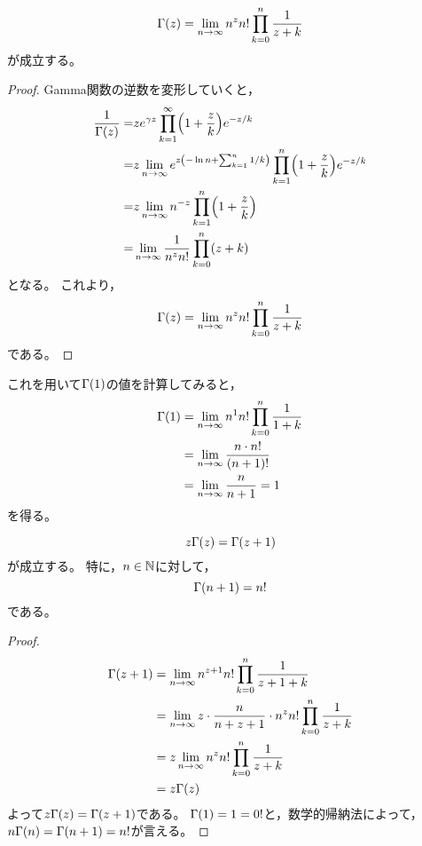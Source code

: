 \documentclass[a4paper,draft]{ltjsarticle}
\begin{document}
\begin{prop}[Gamma関数のEuler乗積表示]\label{prop:gamma-euler}
    \begin{equation}
        \fun{\Gamma}{z}=\limn n^z n! \prod_{k=0}^n\dfrac{1}{z+k}
    \end{equation}
    が成立する。
    \begin{proof}
        Gamma関数の逆数を変形していくと，
        \begin{align}
            \dfrac{1}{\fun{\Gamma}{z}}
            = & ze^{\gamma z}\prod_{k=1}^\infty\pare{1+\dfrac{z}{k}}e^{-z/k}
            \\
            = & z\limn e^{z\pare{-\ln n+\sum_{k=1}^n 1/k}}\prod_{k=1}^n\pare{1+\dfrac{z}{k}}e^{-z/k}
            \\
            = & z\limn n^{-z}\prod_{k=1}^n\pare{1+\dfrac{z}{k}}
            \\
            = & \limn\dfrac{1}{n^z n!}\prod_{k=0}^n\pare{z+k}
        \end{align}
        となる。
        これより，
        \begin{equation}
            \fun{\Gamma}{z}=\limn n^z n! \prod_{k=0}^n\dfrac{1}{z+k}
        \end{equation}
        である。
    \end{proof}
\end{prop}

これを用いて$\fun{\Gamma}{1}$の値を計算してみると，
\begin{align}
    \fun{\Gamma}{1}&=\limn n^1 n!\prod_{k=0}^n\dfrac{1}{1+k}
    \\
    &=\limn\dfrac{n\cdot n!}{\pare{n+1}!}
    \\
    &=\limn\dfrac{n}{n+1}=1
\end{align}
を得る。

\begin{prop}[階乗の一般化]\label{prop:階乗の一般化}
    \begin{equation}
        z\fun{\Gamma}{z}=\fun{\Gamma}{z+1}
    \end{equation}
    が成立する。
    特に，$n\in\mathbb{N}$に対して，
    \begin{equation}
        \fun{\Gamma}{n+1}=n!
    \end{equation}
    である。
    \begin{proof}
        \begin{align}
            \fun{\Gamma}{z+1}&=\limn n^{z+1}n!\prod_{k=0}^n\dfrac{1}{z+1+k}
            \\
            &=\limn z\cdot \dfrac{n}{n+z+1}\cdot n^z n!\prod_{k=0}^n \dfrac{1}{z+k}
            \\
            &=z\limn n^z n!\prod_{k=0}^n \dfrac{1}{z+k}
            \\
            &=z\fun{\Gamma}{z}
        \end{align}
        よって$z\fun{\Gamma}{z}=\fun{\Gamma}{z+1}$である。
        $\fun{\Gamma}{1}=1=0!$と，数学的帰納法によって，$n\fun{\Gamma}{n}=\fun{\Gamma}{n+1}=n!$が言える。
    \end{proof}
\end{prop}
\end{document}
